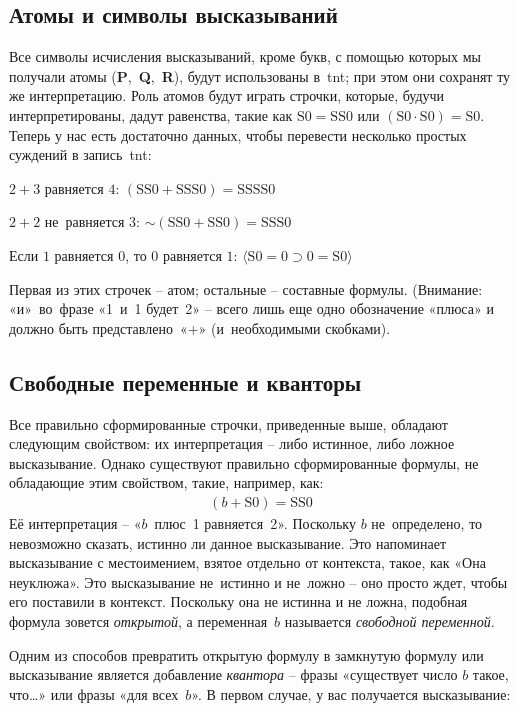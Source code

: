 \documentclass[../main.tex]{subfiles}
\begin{document}
\subsection{Атомы и символы высказываний}

Все символы исчисления высказываний, кроме букв, с помощью которых мы получали атомы (\textbf{P},~\textbf{Q},~\textbf{R}), будут использованы в~\acs{tnt}; при этом они сохранят ту же интерпретацию. Роль атомов будут играть строчки, которые, будучи интерпретированы, дадут равенства, такие как $\mathrm{S0} = \mathrm{SS0}$ или $(\mathrm{S0} \cdot \mathrm{S0}) = \mathrm{S0}$. Теперь у нас есть достаточно данных, чтобы перевести несколько простых суждений в запись~\acs{tnt}:

$2+3$ равняется $4$: $(\mathrm{SS0} + \mathrm{SSS0}) = \mathrm{SSSS0}$

$2+2$ не~равняется $3$: $\mathord{\sim} (\mathrm{SS0} + \mathrm{SS0}) = \mathrm{SSS0}$

Если $1$ равняется $0$, то $0$ равняется $1$: $\mathrm{\langle S0=0 \supset 0=S0 \rangle}$

Первая из этих строчек \--- атом; остальные \--- составные формулы. (Внимание: «и»~во~фразе «1~и~1 будет~2» \--- всего лишь еще одно обозначение «плюса» и должно быть представлено~«+» (и~необходимыми скобками).


\subsection{Свободные переменные и кванторы}

Все правильно сформированные строчки, приведенные выше, обладают следующим свойством: их интерпретация \--- либо истинное, либо ложное высказывание. Однако существуют правильно сформированные формулы, не обладающие этим свойством, такие, например, как:
\begin{gather*}
    (b+\mathrm{S0}) = \mathrm{SS0}
\end{gather*}
Её интерпретация \--- «$b$~плюс~1 равняется~2». Поскольку $b$ не~определено, то невозможно сказать, истинно ли данное высказывание. Это напоминает высказывание с местоимением, взятое отдельно от контекста, такое, как «Она неуклюжа». Это высказывание не~истинно и не~ложно \--- оно просто ждет, чтобы его поставили в контекст. Поскольку она не истинна и не ложна, подобная формула зовется \emph{открытой}, а переменная~$b$ называется \emph{свободной переменной}.

Одним из способов превратить открытую формулу в замкнутую формулу или высказывание является добавление \emph{квантора} \--- фразы «существует число $b$ такое, что\ldots» или фразы «для всех~$b$». В первом случае, у вас получается высказывание:
\end{document}
